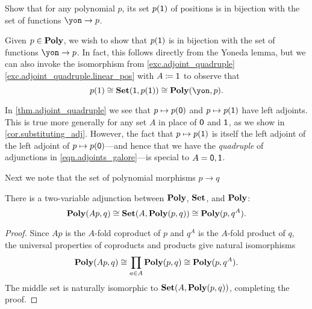 \documentclass[Book-Poly]{subfiles}
\begin{document}
\begin{exercise}\label{exc.positions_maps_yon}
Show that for any polynomial $p$, its set $p(\textsf{1})$ of positions is in bijection with the set of functions $\yon\to p$.
\begin{solution}
Given $p \in \mathbf{Poly}$, we wish to show that $p(\textsf{1})$ is in bijection with the set of functions $\yon \to p$.
In fact, this follows directly from the Yoneda lemma, but we can also invoke the isomorphism from \cref{exc.adjoint_quadruple} \cref{exc.adjoint_quadruple.linear_pos} with $A \coloneqq \textsf{1}$ to observe that
\[
    p(1) \iso \smset(\1, p(\1)) \iso \poly(\yon, p).
\]
\end{solution}
\end{exercise}

In \cref{thm.adjoint_quadruple} we see that $p\mapsto p(\textsf{0})$ and $p\mapsto p(\textsf{1})$ have left adjoints. This is true more generally for any set $A$ in place of $\textsf{0}$ and $\textsf{1}$, as we show in \cref{cor.substituting_adj}. However, the fact that $p\mapsto p(\textsf{1})$ is itself the left adjoint of the left adjoint of $p\mapsto p(\textsf{0})$---and hence that we have the \emph{quadruple} of adjunctions in \eqref{eqn.adjoints_galore}---is special to $A=\textsf{0},\textsf{1}$.

Next we note that the set of polynomial morphisms $p\to q$ %

\begin{proposition}\label{prop.two_var_adj}
There is a two-variable adjunction between $\mathbf{Poly}$, $\mathbf{Set}$, and $\mathbf{Poly}$:%
\begin{equation}\label{eqn.two_var_adj}
\mathbf{Poly}(Ap,q) \cong \mathbf{Set}(A,\mathbf{Poly}(p,q)) \cong \mathbf{Poly}(p,q^A).
\end{equation}
\end{proposition}
\begin{proof}
Since $Ap$ is the $A$-fold coproduct of $p$ and $q^A$ is the $A$-fold product of $q$, the universal properties of coproducts and products give natural isomorphisms
\[\mathbf{Poly}(Ap,q)\cong\prod_{a\in A}\mathbf{Poly}(p,q)\cong\mathbf{Poly}(p,q^A).\]
The middle set is naturally isomorphic to $\mathbf{Set}(A,\mathbf{Poly}(p,q))$, completing the proof.
\end{proof}
\end{document}
